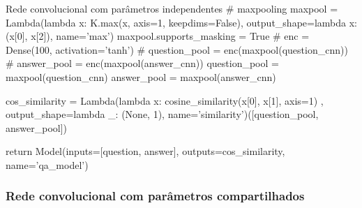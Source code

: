 \begin{mypython-linenumber}{Rede convolucional com parâmetros independentes}
        # maxpooling
        maxpool = Lambda(lambda x: K.max(x, axis=1, keepdims=False), output_shape=lambda x: (x[0], x[2]),
                         name='max')
        maxpool.supports_masking = True
        # enc = Dense(100, activation='tanh')
        # question_pool = enc(maxpool(question_cnn))
        # answer_pool = enc(maxpool(answer_cnn))
        question_pool = maxpool(question_cnn)
        answer_pool = maxpool(answer_cnn)

        cos_similarity = Lambda(lambda x: cosine_similarity(x[0], x[1], axis=1)
                                       , output_shape=lambda _: (None, 1), name='similarity')([question_pool,
                                                                                               answer_pool])

        return Model(inputs=[question, answer], outputs=cos_similarity,
                                   name='qa_model')
\end{mypython-linenumber}
\vspace{2cm}
\subsubsection{Rede convolucional com parâmetros compartilhados}

